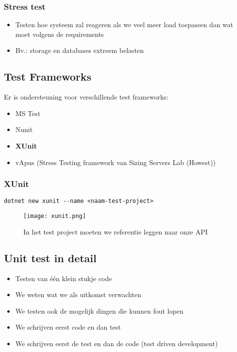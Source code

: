 \documentclass{article}
\begin{document}
\subsubsection{Stress test}

\begin{itemize}
    \item Testen hoe systeem zal reageren als we veel meer load toepassen dan wat moet volgens de requirements
    \item Bv.: storage en databases extreem belasten
\end{itemize}

\subsection{Test Frameworks}

Er is ondersteuning voor verschillende test frameworks:

\begin{itemize}
    \item MS Test
    \item Nunit
    \item \textbf{XUnit}
    \item vApus (Stress Testing framework van Sizing Servers Lab (Howest))
\end{itemize}

\subsubsection{XUnit}

\begin{verbatim}
dotnet new xunit --name <naam-test-project>
\end{verbatim}

\begin{figure}[H]
    \centering
    \texttt{[image: xunit.png]}
    \caption{In het test project moeten we referentie leggen naar onze API}
\end{figure}

\subsection{Unit test in detail}

\begin{itemize}
    \item Testen van één klein stukje code
    \item We weten wat we als uitkomst verwachten
    \item We testen ook de mogelijk dingen die kunnen fout lopen
    \item We schrijven eerst code en dan test
    \item We schrijven eerst de test en dan de code (test driven development)
\end{itemize}
\end{document}
